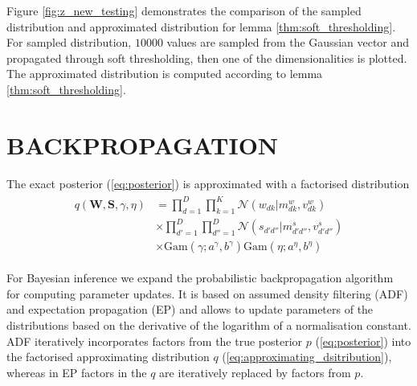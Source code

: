 \documentclass[letterpaper]{article}
\begin{document}
Figure \ref{fig:z_new_testing} demonstrates the comparison of the sampled distribution and approximated distribution for lemma \ref{thm:soft_thresholding}. For sampled distribution, $10000$ values are sampled from the Gaussian vector and propagated through soft thresholding, then one of the dimensionalities is plotted. The approximated distribution is computed according to lemma \ref{thm:soft_thresholding}.


%


\section{\uppercase{Backpropagation}}
\label{sec:backpropagation}

The exact posterior (\ref{eq:posterior}) is approximated with a factorised distribution
\begin{align}
\label{eq:approximating_dsitribution}
\begin{split}
q(\mathbf{W}, \mathbf{S}, \gamma, \eta) &= \prod_{d=1}^D\prod_{k=1}^K \mathcal{N}(w_{dk} | m^w_{dk}, v^w_{dk}) \\
&\times \prod_{d'=1}^D\prod_{d''=1}^D \mathcal{N}(s_{d'd''} | m^s_{d'd''}, v^s_{d'd''}) \\
&\times \text{Gam}(\gamma; a^\gamma, b^\gamma) \text{Gam}(\eta; a^\eta, b^\eta)
\end{split}
\end{align}

For Bayesian inference we expand the probabilistic backpropagation algorithm~\citep{hernandez2015probabilistic} for computing parameter updates. It is based on assumed density filtering (ADF) and expectation propagation (EP) and allows to update parameters of the distributions based on the derivative of the logarithm of a normalisation constant. ADF iteratively incorporates factors from the true posterior $p$ (\ref{eq:posterior}) into the factorised approximating distribution $q$ (\ref{eq:approximating_dsitribution}), whereas in EP factors in the $q$ are iteratively replaced by factors from $p$.
\end{document}
